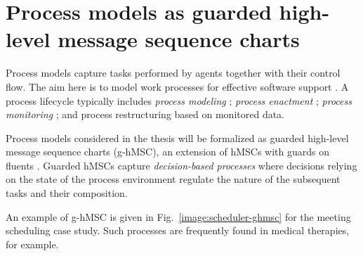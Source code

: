 \section{Process models as guarded high-level message sequence charts\label{section:background-process-models}}

Process models capture tasks performed by agents together with their control flow. The aim here is to model work processes for effective software support \cite{Dumas:2005}. A process lifecycle typically includes \emph{process modeling} \cite{OMG:2004, OMG:2008, Clarke:2008, Damas:2009}; \emph{process enactment} \cite{Manolescu:2002, Buhler:2005, Sauer:2006}; \emph{process monitoring} \cite{Muehlen:2000}; and process restructuring based on monitored data. 

Process models considered in the thesis will be formalized as guarded high-level message sequence charts (g-hMSC), an extension of hMSCs with guards on fluents \cite{Damas:2009, Damas:2011}. Guarded hMSCs capture \emph{decision-based processes} where decisions relying on the state of the process environment regulate the nature of the subsequent tasks and their composition. 

An example of g-hMSC is given in Fig.~\ref{image:scheduler-ghmsc} for the meeting scheduling case study. Such processes are frequently found in medical therapies, for example.  

